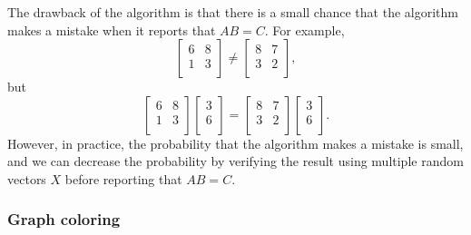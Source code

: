 The drawback of the algorithm is
that there is a small chance that the algorithm
makes a mistake when it reports that $AB=C$.
For example,
\[
 \begin{bmatrix}
  6 & 8 \\
  1 & 3 \\
 \end{bmatrix}
\neq
 \begin{bmatrix}
  8 & 7 \\
  3 & 2 \\
 \end{bmatrix},
\]
but
\[
 \begin{bmatrix}
  6 & 8 \\
  1 & 3 \\
 \end{bmatrix}
 \begin{bmatrix}
  3 \\
  6 \\
 \end{bmatrix}
=
 \begin{bmatrix}
  8 & 7 \\
  3 & 2 \\
 \end{bmatrix}
 \begin{bmatrix}
  3 \\
  6 \\
 \end{bmatrix}.
\]
However, in practice, the probability that the
algorithm makes a mistake is small,
and we can decrease the probability by
verifying the result using multiple random vectors $X$
before reporting that $AB=C$.

\subsubsection{Graph coloring}


